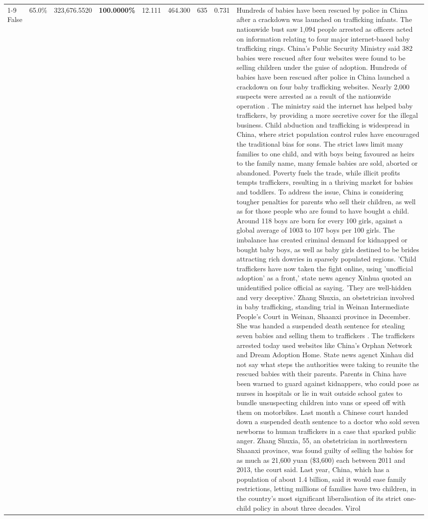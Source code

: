 \begin{table}[H]
\begin{tabular}{lllrlllll}
\cline{1-9}
False & 65.0\% & 323,676.5520 & \bfseries \color{red} 100.0000\% & 12.111 & 464.300 & 635 & 0.731 & Hundreds of babies have been rescued by police in China after a crackdown was launched on trafficking infants. The nationwide bust saw 1,094 people arrested as officers acted on information relating to four major internet-based baby trafficking rings. China's Public Security Ministry said 382 babies were rescued after four websites were found to be selling children under the guise of adoption. Hundreds of babies have been rescued after police in China launched a crackdown on four baby trafficking websites. Nearly 2,000 suspects were arrested as a result of the nationwide operation . The ministry said the internet has helped baby traffickers, by providing a more secretive cover for the illegal business. Child abduction and trafficking is widespread in China, where strict population control rules have encouraged the traditional bias for sons. The strict laws limit many families to one child, and with boys being favoured as heirs to the family name, many female babies are sold, aborted or abandoned. Poverty fuels the trade, while illicit profits tempts traffickers, resulting in a thriving market for babies and toddlers. To address the issue, China is considering tougher penalties for parents who sell their children, as well as for those people who are found to have bought a child. Around 118 boys are born for every 100 girls, against a global average of 1003 to 107 boys per 100 girls. The imbalance has created criminal demand for kidnapped or bought baby boys, as well as baby girls destined to be brides attracting rich dowries in sparsely populated regions. 'Child traffickers have now taken the fight online, using 'unofficial adoption' as a front,' state news agency Xinhua quoted an unidentified police official as saying. 'They are well-hidden and very deceptive.' Zhang Shuxia, an obstetrician involved in baby trafficking, standing trial in Weinan Intermediate People's Court in Weinan, Shaanxi province in December. She was handed a suspended death sentence for stealing seven babies and selling them to traffickers . The traffickers arrested today used websites like China's Orphan Network and Dream Adoption Home. State news agenct Xinhau did not say what steps the authorities were taking to reunite the rescued babies with their parents. Parents in China have been warned to guard against kidnappers, who could pose as nurses in hospitals or lie in wait outside school gates to bundle unsuspecting children into vans or speed off with them on motorbikes. Last month a Chinese court handed down a suspended death sentence to a doctor who sold seven newborns to human traffickers in a case that sparked public anger. Zhang Shuxia, 55, an obstetrician in northwestern Shaanxi province, was found guilty of selling the babies for as much as 21,600 yuan (\$3,600) each between 2011 and 2013, the court said. Last year, China, which has a population of about 1.4 billion, said it would ease family restrictions, letting millions of families have two children, in the country's most significant liberalisation of its strict one-child policy in about three decades. Virol \\

\end{tabular}
\end{table}
